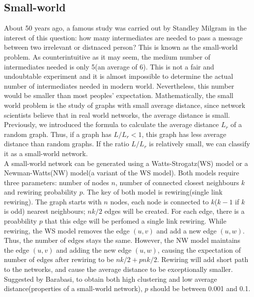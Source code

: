 \documentclass[12pt]{article}
\begin{document}
\subsection{Small-world}
\label{small_world}
About 50 years ago, a famous study was carried out by Standley Milgram\cite{milgram1967small} in the interest of this question: how many intermediates are needed to pass a message between two irrelevant or distnaced person? This is known as the small-world problem. As counterintuitive as it may seem, the medium number of intermediates needed is only 5(an average of 6). This is not a fair and undoubtable experiment and it is almost impossible to determine the actual number of intermediates needed in modern world. Nevertheless, this number would be smaller than most peoples' expectation. Mathematically, the small world problem is the study of graphs with small average distance, since network scientists believe that in real world networks, the average distance is small. Previously, we introduced the formula to calculate the average distance $L_r$ of a random graph. Thus, if a graph has $L/L_r <1$, this graph has less average distance than random graphs. If the ratio $L/L_r$ is relatively small, we can classify it as a small-world network.\\
\noindent
A small-world network can be generated using a Watts-Strogatz(WS) model\cite{wsmodel} or a Newman-Watts(NW) model(a variant of the WS model)\cite{nwmodel}. Both models require three parameters: number of nodes $n$, number of connected closest neighbours $k$ and rewiring probability $p$. The key of both model is rewiring(single link rewiring). The graph starts with $n$ nodes, each node is connected to $k$($k-1$ if $k$ is odd) nearest neighbours; $nk/2$ edges will be created. For each edge, there is a proabbility $p$ that this edge will be perfomed a single link rewiring. While rewiring, the WS model removes the edge $(u,v)$ and add a new edge $(u,w)$. Thus, the number of edges stays the same. However, the NW model maintains the edge $(u,v)$ and adding the new edge $(u,w)$, causing the expectation of number of edges after rewiring to be $nk/2+pnk/2$. Rewiring will add short path to the networks, and cause the average distance to be exceptionally smaller. Suggested by Barabasi\cite{barabási2016network}, to obtain both high clustering and low average distance(properties of a small-world network), $p$ should be between 0.001 and 0.1.\\
\end{document}
